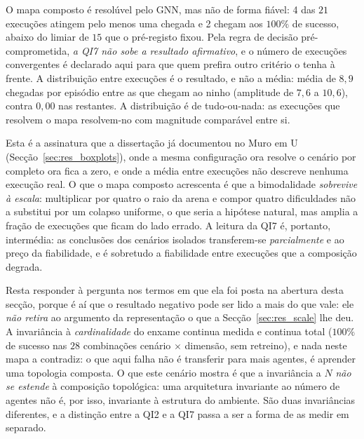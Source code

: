 O mapa composto é resolúvel pelo GNN, mas não de forma
fiável: 4 das $21$ execuções atingem pelo menos uma chegada e
2 chegam aos $100\%$ de sucesso, abaixo do limiar de $15$ que
o pré-registo fixou. Pela regra de decisão pré-comprometida, \emph{a QI7 não
sobe a resultado afirmativo}, e o número de execuções convergentes é declarado
aqui para que quem prefira outro critério o tenha à frente. A distribuição
entre execuções é o resultado, e não a média: média de $8{,}9$ chegadas por episódio entre as que chegam ao ninho (amplitude de $7{,}6$ a $10{,}6$), contra $0{,}00$ nas restantes. A distribuição é de tudo-ou-nada: as execuções que resolvem o mapa resolvem-no com magnitude comparável entre si.

Esta é a assinatura que a dissertação já documentou no Muro em U
(Secção~\ref{sec:res_boxplots}), onde a mesma configuração ora resolve o
cenário por completo ora fica a zero, e onde a média entre execuções não
descreve nenhuma execução real. O que o mapa composto acrescenta é que a
bimodalidade \emph{sobrevive à escala}: multiplicar por quatro o raio da arena
e compor quatro dificuldades não a substitui por um colapso uniforme, o que
seria a hipótese natural, mas amplia a fração de execuções que ficam do lado
errado. A leitura da QI7 é, portanto, intermédia: as conclusões dos
cenários isolados transferem-se \emph{parcialmente} e ao preço da fiabilidade,
e é sobretudo a fiabilidade entre execuções que a composição degrada.

Resta responder à pergunta nos termos em que ela foi posta na abertura desta
secção, porque é aí que o resultado negativo pode ser lido a mais do que vale:
ele \emph{não retira} ao argumento da representação o que a
Secção~\ref{sec:res_scale} lhe deu. A invariância à \emph{cardinalidade} do
enxame continua medida e continua total ($100\%$ de sucesso nas $28$
combinações cenário $\times$ dimensão, sem retreino), e nada neste mapa a
contradiz: o que aqui falha não é transferir para mais agentes, é aprender uma
topologia composta. O que este cenário mostra é que a invariância a $N$
\emph{não se estende} à composição topológica: uma arquitetura invariante ao
número de agentes não é, por isso, invariante à estrutura do ambiente. São duas
invariâncias diferentes, e a distinção entre a QI2 e a QI7 passa a ser a forma de
as medir em separado.

